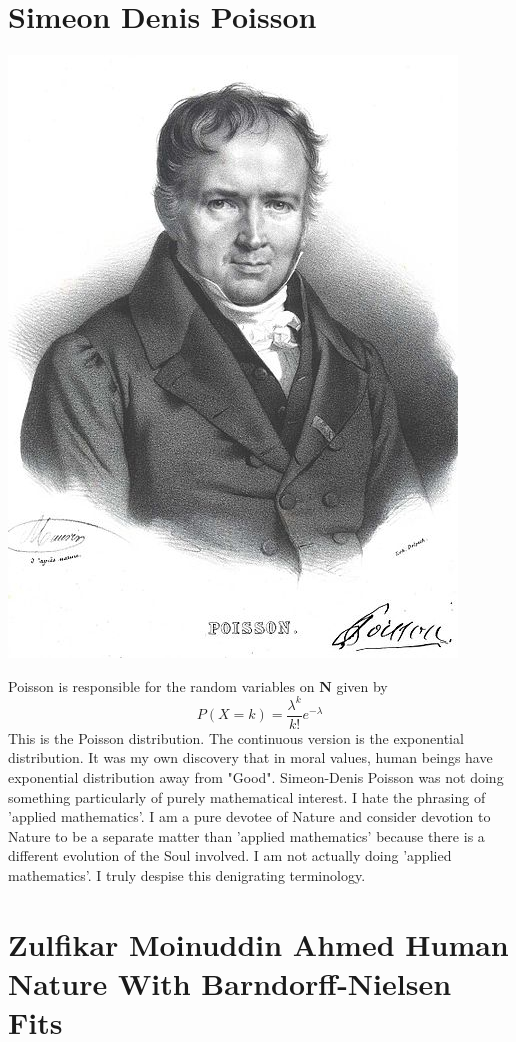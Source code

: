 \documentclass{amsart}
\begin{document}
\section{Simeon Denis Poisson}

\includegraphics[scale=0.6]{poisson.jpg}

Poisson is responsible for the random variables on $\mathbf{N}$ given by 
\[
P(X = k ) = \frac{\lambda^k}{k!} e^{-\lambda}
\]
This is the Poisson distribution.  The continuous version is the exponential distribution.  It was my own discovery that in moral values, human beings have exponential distribution away from "Good".  Simeon-Denis Poisson was not doing something particularly of purely mathematical interest.  I hate the phrasing of 'applied mathematics'.  I am a pure devotee of Nature and consider devotion to Nature to be a separate matter than 'applied mathematics' because there is a different evolution of the Soul involved.  I am not actually doing 'applied mathematics'.  I truly despise this denigrating terminology.

\section{Zulfikar Moinuddin Ahmed Human Nature With Barndorff-Nielsen Fits}
\end{document}
